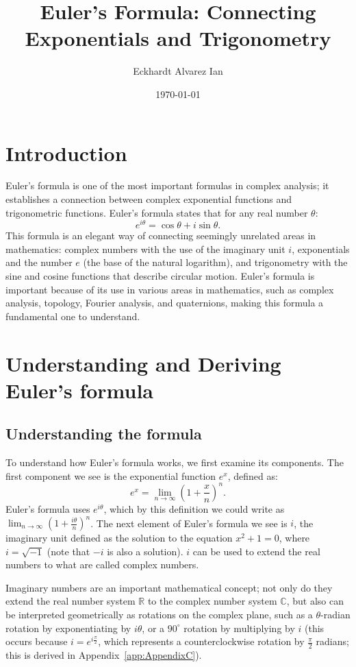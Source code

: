 \documentclass[12pt,a4paper]{article}
\title{Euler's Formula: Connecting Exponentials and Trigonometry}
\author{Eckhardt Alvarez Ian}
\date{\today}
\begin{document}
\maketitle
\tableofcontents

\section{Introduction}
Euler's formula is one of the most important formulas in complex analysis; it establishes a connection between complex exponential functions and trigonometric functions. Euler's formula states that for any real number $\theta$:
\begin{equation}
e^{i\theta} = \cos{\theta} + i\sin{\theta}.
\end{equation}
This formula is an elegant way of connecting seemingly unrelated areas in mathematics: complex numbers with the use of the imaginary unit $i$, exponentials and the number $e$ (the base of the natural logarithm), and trigonometry with the sine and cosine functions that describe circular motion.
Euler's formula is important because of its use in various areas in mathematics, such as complex analysis, topology, Fourier analysis, and quaternions, making this formula a fundamental one to understand.
\pagebreak
\section{Understanding and Deriving Euler's formula}
\subsection{Understanding the formula}
To understand how Euler's formula works, we first examine its components. The first component we see is the exponential function $e^x$, defined as:
\begin{equation}
e^x = \lim_{n\to\infty} \left(1 + \frac{x}{n}\right)^n.
\end{equation}
Euler's formula uses $e^{i\theta}$, which by this definition we could write as
\(
\lim_{n\to\infty} \left(1 + \frac{i\theta}{n}\right)^n
\).
The next element of Euler's formula we see is $i$, the imaginary unit defined as the solution to the equation $x^2+1=0$, where $i = \sqrt{-1}$ (note that $-i$ is also a solution). $i$ can be used to extend the real numbers to what are called complex numbers. 

Imaginary numbers are an important mathematical concept; not only do they extend the real number system $\mathbb{R}$ to the complex number system $\mathbb{C}$, but also can be interpreted geometrically as rotations on the complex plane, such as a $\theta$-radian rotation by exponentiating by $i\theta$, or a $90^{\circ}$ rotation by multiplying by $i$ (this occurs because $i = e^{i\frac{\pi}{2}}$, which represents a counterclockwise rotation by $\frac{\pi}{2}$ radians; this is derived in Appendix~\ref{app:AppendixC}).
\end{document}
